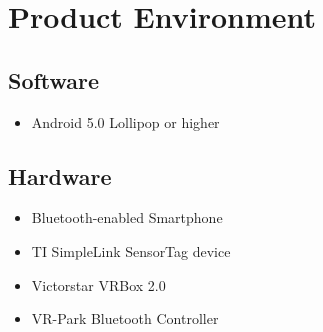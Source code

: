 \section{Product Environment}

\subsection{Software}

\begin{itemize}
  \item Android 5.0 Lollipop or higher
\end{itemize}

\subsection{Hardware}

\begin{itemize}
  \item Bluetooth-enabled Smartphone
  \item TI SimpleLink SensorTag device
  \item Victorstar VRBox 2.0
  \item VR-Park Bluetooth Controller
\end{itemize}
